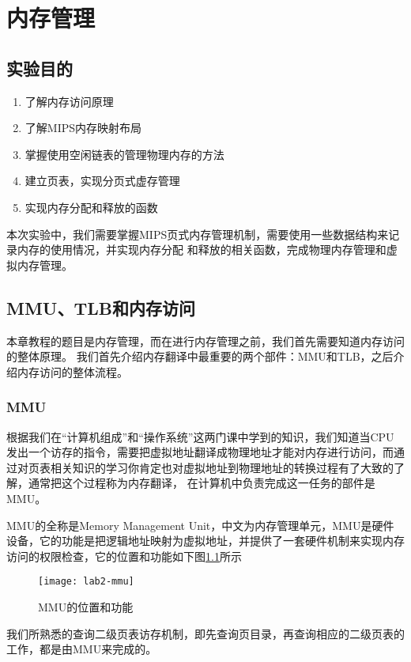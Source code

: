 \chapter{内存管理}

\section{实验目的}
  \begin{enumerate}
    \item 了解内存访问原理
    \item 了解MIPS内存映射布局
    \item 掌握使用空闲链表的管理物理内存的方法
    \item 建立页表，实现分页式虚存管理
    \item 实现内存分配和释放的函数
  \end{enumerate}

本次实验中，我们需要掌握MIPS页式内存管理机制，需要使用一些数据结构来记录内存的使用情况，并实现内存分配
和释放的相关函数，完成物理内存管理和虚拟内存管理。

\section{MMU、TLB和内存访问}

本章教程的题目是内存管理，而在进行内存管理之前，我们首先需要知道内存访问的整体原理。
我们首先介绍内存翻译中最重要的两个部件：MMU和TLB，之后介绍内存访问的整体流程。

\subsection{MMU}
根据我们在“计算机组成”和“操作系统”这两门课中学到的知识，我们知道当CPU发出一个访存的指令，需要把虚拟地址翻译成物理地址才能对内存进行访问，而通过对页表相关知识的学习你肯定也对虚拟地址到物理地址的转换过程有了大致的了解，通常把这个过程称为内存翻译， 在计算机中负责完成这一任务的部件是MMU。

MMU的全称是Memory Management Unit，中文为内存管理单元，MMU是硬件设备，它的功能是把逻辑地址映射为虚拟地址，并提供了一套硬件机制来实现内存访问的权限检查，它的位置和功能如下图\ref{lab2-mmu}所示

\begin{figure}[htbp]
  \centering
  \texttt{[image: lab2-mmu]}
  \caption{MMU的位置和功能}\label{lab2-mmu}
\end{figure}

我们所熟悉的查询二级页表访存机制，即先查询页目录，再查询相应的二级页表的工作，都是由MMU来完成的。

